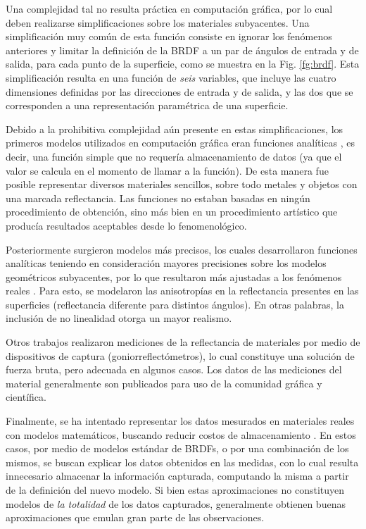 Una complejidad tal no resulta práctica en computación gráfica, por lo cual deben realizarse simplificaciones sobre los materiales subyacentes.
Una simplificación muy común de esta función consiste en ignorar los fenómenos anteriores y limitar la definición de la BRDF a un par de ángulos de entrada y de salida, para cada punto de la superficie, como se muestra en la Fig. \ref{fg:brdf}.
Esta simplificación resulta en una función de {\em seis} variables, que incluye las cuatro dimensiones definidas por las direcciones de entrada y de salida, y las dos que se corresponden a una representación paramétrica de una superficie.

Debido a la prohibitiva complejidad aún presente en estas simplificaciones, los primeros modelos utilizados en computación gráfica eran funciones analíticas \cite{Phong1975,Blinn1977}, es decir, una función simple que no requería almacenamiento de datos (ya que el valor se calcula en el momento de llamar a la función).
De esta manera fue posible representar diversos materiales sencillos, sobre todo metales y objetos con una marcada reflectancia.
Las funciones no estaban basadas en ningún procedimiento de obtención, sino más bien en un procedimiento artístico que producía resultados aceptables desde lo fenomenológico.

Posteriormente surgieron modelos más precisos, los cuales desarrollaron funciones analíticas teniendo en consideración mayores precisiones sobre los modelos geométricos subyacentes, por lo que resultaron más ajustadas a los fenómenos reales \cite{He1991,Ward1992,Lafortune1997}.
Para esto, se modelaron las anisotropías en la reflectancia presentes en las superficies (reflectancia diferente para distintos ángulos).
En otras palabras, la inclusión de no linealidad otorga un mayor realismo.

Otros trabajos \cite{Dana1999,Matusik2003} realizaron mediciones de la reflectancia de materiales por medio de dispositivos de captura (goniorreflectómetros), lo cual constituye una solución de fuerza bruta, pero adecuada en algunos casos.
Los datos de las mediciones del material generalmente son publicados para uso de la comunidad gráfica y científica.

Finalmente, se ha intentado representar los datos mesurados en materiales reales con modelos matemáticos, buscando reducir costos de almacenamiento \cite{Ngan2005}.
En estos casos, por medio de modelos estándar de BRDFs, o por una combinación de los mismos, se buscan explicar los datos obtenidos en las medidas, con lo cual resulta innecesario almacenar la información capturada, computando la misma a partir de la definición del nuevo modelo.
Si bien estas aproximaciones no constituyen modelos de {\em la totalidad} de los datos capturados, generalmente obtienen buenas aproximaciones que emulan gran parte de las observaciones.

